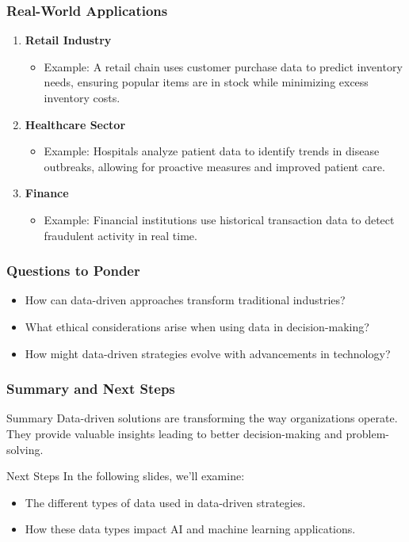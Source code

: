 \documentclass[aspectratio=169]{beamer}
\begin{document}
\begin{frame}[fragile]
    \frametitle{Real-World Applications}
    \begin{enumerate}
        \item \textbf{Retail Industry}
            \begin{itemize}
                \item Example: A retail chain uses customer purchase data to predict inventory needs, ensuring popular items are in stock while minimizing excess inventory costs.
            \end{itemize}
        
        \item \textbf{Healthcare Sector}
            \begin{itemize}
                \item Example: Hospitals analyze patient data to identify trends in disease outbreaks, allowing for proactive measures and improved patient care.
            \end{itemize}
        
        \item \textbf{Finance}
            \begin{itemize}
                \item Example: Financial institutions use historical transaction data to detect fraudulent activity in real time.
            \end{itemize}
    \end{enumerate}
\end{frame}

\begin{frame}[fragile]
    \frametitle{Questions to Ponder}
    \begin{itemize}
        \item How can data-driven approaches transform traditional industries?
        \item What ethical considerations arise when using data in decision-making?
        \item How might data-driven strategies evolve with advancements in technology?
    \end{itemize}
\end{frame}

\begin{frame}[fragile]
    \frametitle{Summary and Next Steps}
    \begin{block}{Summary}
        Data-driven solutions are transforming the way organizations operate. They provide valuable insights leading to better decision-making and problem-solving.
    \end{block}

    \begin{block}{Next Steps}
        In the following slides, we'll examine:
        \begin{itemize}
            \item The different types of data used in data-driven strategies.
            \item How these data types impact AI and machine learning applications.
        \end{itemize}
    \end{block}
\end{frame}
\end{document}
